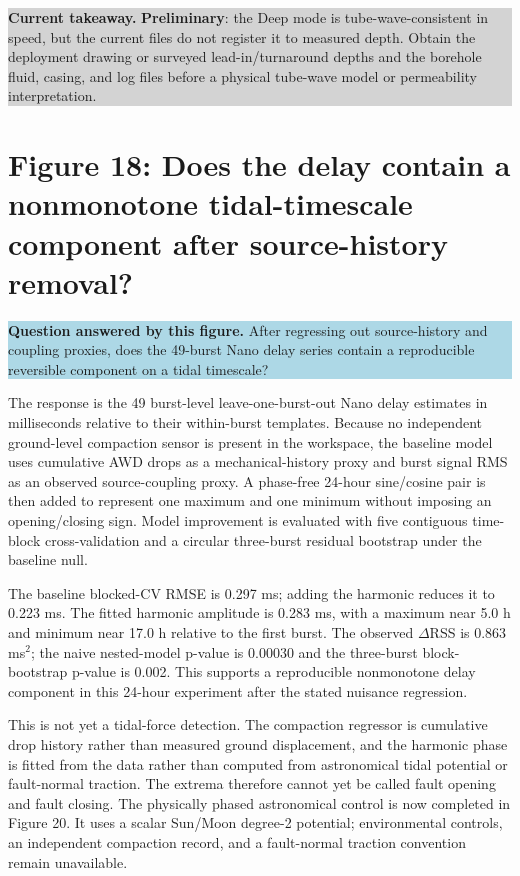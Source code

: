 \documentclass[11pt]{article}
\newcommand{\preliminary}{\textcolor{preliminary}{\textbf{Preliminary}}}
\newcommand{\figquestion}[1]{\par\medskip\noindent\colorbox{lightblue}{\parbox{0.95\linewidth}{\textcolor{questionblue}{\textbf{Question answered by this figure.}} #1}}\par\medskip}
\newcommand{\takeaway}[1]{\par\smallskip\noindent\colorbox{lightgray}{\parbox{0.95\linewidth}{\textbf{Current takeaway.} #1}}\par\medskip}
\begin{document}
\takeaway{\preliminary: the Deep mode is tube-wave-consistent in speed, but the current files do not register it to measured depth.  Obtain the deployment drawing or surveyed lead-in/turnaround depths and the borehole fluid, casing, and log files before a physical tube-wave model or permeability interpretation.}

\section{Figure 18: Does the delay contain a nonmonotone tidal-timescale component after source-history removal?}
\figquestion{After regressing out source-history and coupling proxies, does the 49-burst Nano delay series contain a reproducible reversible component on a tidal timescale?}

The response is the 49 burst-level leave-one-burst-out Nano delay estimates in
milliseconds relative to their within-burst templates.  Because no independent
ground-level compaction sensor is present in the workspace, the baseline model
uses cumulative AWD drops as a mechanical-history proxy and burst signal RMS as
an observed source-coupling proxy.  A phase-free 24-hour sine/cosine pair is
then added to represent one maximum and one minimum without imposing an
opening/closing sign.  Model improvement is evaluated with five contiguous
time-block cross-validation and a circular three-burst residual bootstrap under
the baseline null.

The baseline blocked-CV RMSE is 0.297 ms; adding the harmonic reduces it to
0.223 ms.  The fitted harmonic amplitude is 0.283 ms, with a maximum near
5.0 h and minimum near 17.0 h relative to the first burst.  The observed
$\Delta$RSS is 0.863 ms$^2$; the naive nested-model p-value is 0.00030 and
the three-burst block-bootstrap p-value is 0.002.  This supports a reproducible
nonmonotone delay component in this 24-hour experiment after the stated nuisance
regression.

This is not yet a tidal-force detection.  The compaction regressor is
cumulative drop history rather than measured ground displacement, and the
harmonic phase is fitted from the data rather than computed from astronomical
tidal potential or fault-normal traction.  The extrema therefore cannot yet be
called fault opening and fault closing.  The physically phased astronomical control is now completed in Figure 20. It uses a scalar
Sun/Moon degree-2 potential; environmental controls, an independent compaction
record, and a fault-normal traction convention remain unavailable.
\end{document}
